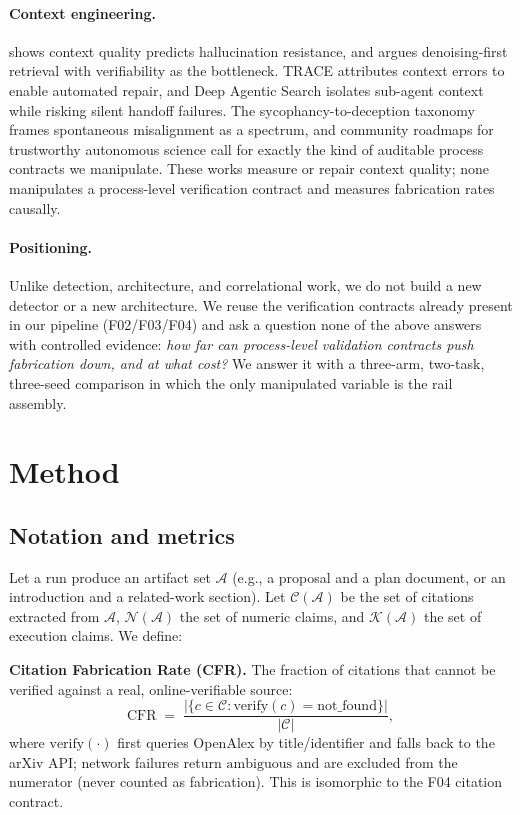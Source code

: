 \documentclass[10pt,twocolumn]{article}
\begin{document}
\paragraph{Context engineering.}
\citet{bousetouane2026context} shows context quality predicts hallucination resistance, and \citet{dai2026llmorir} argues denoising-first retrieval with verifiability as the bottleneck. TRACE \citep{zhao2026trace} attributes context errors to enable automated repair, and Deep Agentic Search \citep{rafieioskooei2026deepagentic} isolates sub-agent context while risking silent handoff failures. The sycophancy-to-deception taxonomy \citep{shi2026sycophancy} frames spontaneous misalignment as a spectrum, and community roadmaps for trustworthy autonomous science \citep{ferreiradasilva2026trustworthy} call for exactly the kind of auditable process contracts we manipulate. These works measure or repair context quality; none manipulates a process-level verification contract and measures fabrication rates causally.

\paragraph{Positioning.}
Unlike detection, architecture, and correlational work, we do not build a new detector or a new architecture. We reuse the verification contracts already present in our pipeline (F02/F03/F04) and ask a question none of the above answers with controlled evidence: \emph{how far can process-level validation contracts push fabrication down, and at what cost?} We answer it with a three-arm, two-task, three-seed comparison in which the only manipulated variable is the rail assembly.

\section{Method}
\label{sec:method}

\subsection{Notation and metrics}
Let a run produce an artifact set $\mathcal{A}$ (e.g., a proposal and a plan document, or an introduction and a related-work section). Let $\mathcal{C}(\mathcal{A})$ be the set of citations extracted from $\mathcal{A}$, $\mathcal{N}(\mathcal{A})$ the set of numeric claims, and $\mathcal{K}(\mathcal{A})$ the set of execution claims. We define:

\textbf{Citation Fabrication Rate (CFR).} The fraction of citations that cannot be verified against a real, online-verifiable source:
\begin{equation}
\mathrm{CFR} \;=\; \frac{|\{c \in \mathcal{C}: \mathrm{verify}(c) = \mathrm{not\_found}\}|}{|\mathcal{C}|},
\end{equation}
where $\mathrm{verify}(\cdot)$ first queries OpenAlex by title/identifier and falls back to the arXiv API; network failures return $\mathrm{ambiguous}$ and are excluded from the numerator (never counted as fabrication). This is isomorphic to the F04 citation contract.
\end{document}
